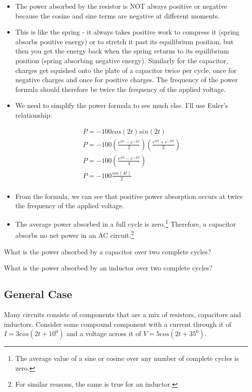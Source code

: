 \begin{itemize}
\item The power absorbed by the resistor is NOT always positive or negative because the cosine and sine terms are negative at different moments.
\item This is like the spring - it always takes positive work to compress it (spring absorbs positive energy) or to stretch it past its equilibrium position, but then you get the energy back when the spring returns to its equilibrium position (spring absorbing negative energy). Similarly for the capacitor, charges get squished onto the plate of a capacitor twice per cycle, once for negative charges and once for positive charges. The frequency of the power formula should therefore be twice the frequency of the applied voltage.
\item We need to simplify the power formula to see much else. I'll use Euler's relationship:

\begin{align*}
P=-100cos(2t)sin(2t)\\
P = -100(\frac{e^{2it}-e^{-2it}}{2})(\frac{e^{2it}+e^{-2it}}{2})\\
P=-100(\frac{e^{4it}-e^{-4it}}{4})\\
P=-100\frac{cos(4t)}{2}\\
\end{align*}
 
\item From the formula, we can see that positive power absorption occurs at twice the frequency of the applied voltage.  
\item The average power absorbed in a full cycle is zero.\footnote{The average value of a sine or cosine over any number of complete cycles is zero.} Therefore, a capacitor absorbs no net power in an AC circuit.\footnote{For similar reasons, the same is true for an inductor.}
\end{itemize}

\begin{alevel}
What is the power absorbed by a capacitor over two complete cycles?
\end{alevel}

\begin{blevel}
What is the power absorbed by an inductor over two complete cycles?
\end{blevel}

\subsection{General Case}
Many circuits consists of components that are a mix of resistors, capacitors and inductors. Consider some compound component with a current through it of $I=3cos(2t+10^0)$ and a voltage across it of $V=5cos(2t+35^0)$.\\

